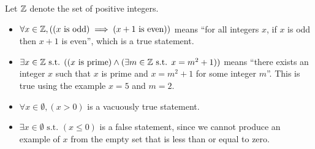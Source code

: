 \begin{example}
    Let $\mathbb{Z}$ denote the set of positive integers.
    \begin{itemize}
        \item $\forall x \in \mathbb{Z}, ((x \text{ is odd}) \implies (x+1 \text{ is even}))$ means ``for all integers $x$, if $x$ is odd then $x+1$ is even'', which is a true statement.
        \item $\exists x \in \mathbb{Z} \text{ s.t. } ((x \text{ is prime}) \land (\exists m \in \mathbb{Z} \text{ s.t. } x = m^2 + 1))$ means ``there exists an integer $x$ such that $x$ is prime and $x = m^2 + 1$ for some integer $m$''. This is true using the example $x = 5$ and $m = 2$.
        \item $\forall x \in \emptyset, (x > 0)$ is a vacuously true statement.
        \item $\exists x \in \emptyset \text{ s.t. } (x \leq 0)$ is a false statement, since we cannot produce an example of $x$ from the empty set that is less than or equal to zero.
    \end{itemize}
\end{example}
